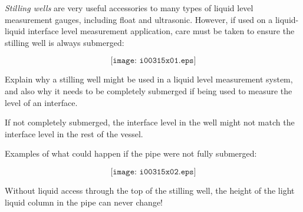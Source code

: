 

{\it Stilling wells} are very useful accessories to many types of liquid level measurement gauges, including float and ultrasonic.  However, if used on a liquid-liquid interface level measurement application, care must be taken to ensure the stilling well is always submerged:

$$\texttt{[image: i00315x01.eps]}$$

Explain why a stilling well might be used in a liquid level measurement system, and also why it needs to be completely submerged if being used to measure the level of an interface.







If not completely submerged, the interface level in the well might not match the interface level in the rest of the vessel.







Examples of what could happen if the pipe were not fully submerged:

$$\texttt{[image: i00315x02.eps]}$$

Without liquid access through the top of the stilling well, the height of the light liquid column in the pipe can never change!




